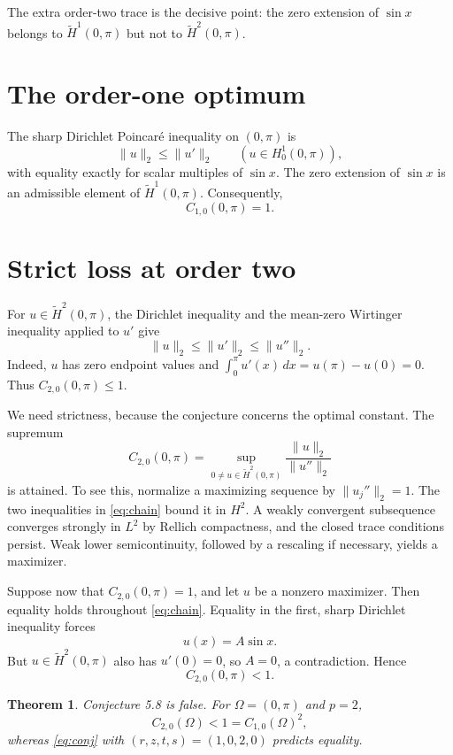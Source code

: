 \documentclass[11pt]{article}
\newtheorem{theorem}{Theorem}
\begin{document}
The extra order-two trace is the decisive point: the zero extension of
$\sin x$ belongs to $\widetilde H^1(0,\pi)$ but not to
$\widetilde H^2(0,\pi)$.

\section{The order-one optimum}

The sharp Dirichlet Poincar\'e inequality on $(0,\pi)$ is
\[
 \|u\|_2\le\|u'\|_2\qquad(u\in H_0^1(0,\pi)),
\]
with equality exactly for scalar multiples of $\sin x$.  The zero extension of
$\sin x$ is an admissible element of $\widetilde H^1(0,\pi)$.  Consequently,
\begin{equation}\label{eq:c10}
 C_{1,0}(0,\pi)=1.
\end{equation}

\section{Strict loss at order two}

For $u\in\widetilde H^2(0,\pi)$, the Dirichlet inequality and the mean-zero
Wirtinger inequality applied to $u'$ give
\begin{equation}\label{eq:chain}
 \|u\|_2\le\|u'\|_2\le\|u''\|_2.
\end{equation}
Indeed, $u$ has zero endpoint values and
$\int_0^\pi u'(x)\,dx=u(\pi)-u(0)=0$.  Thus
$C_{2,0}(0,\pi)\le1$.

We need strictness, because the conjecture concerns the optimal constant.  The
supremum
\[
 C_{2,0}(0,\pi)=
 \sup_{0\ne u\in\widetilde H^2(0,\pi)}
 \frac{\|u\|_2}{\|u''\|_2}
\]
is attained.  To see this, normalize a maximizing sequence by
$\|u_j''\|_2=1$.  The two inequalities in \eqref{eq:chain} bound it in $H^2$.
A weakly convergent subsequence converges strongly in $L^2$ by Rellich
compactness, and the closed trace conditions persist.  Weak lower
semicontinuity, followed by a rescaling if necessary, yields a maximizer.

Suppose now that $C_{2,0}(0,\pi)=1$, and let $u$ be a nonzero maximizer.
Then equality holds throughout \eqref{eq:chain}.  Equality in the first,
sharp Dirichlet inequality forces
\[
 u(x)=A\sin x.
\]
But $u\in\widetilde H^2(0,\pi)$ also has $u'(0)=0$, so $A=0$, a
contradiction.  Hence
\begin{equation}\label{eq:c20}
 C_{2,0}(0,\pi)<1.
\end{equation}

\begin{theorem}
Conjecture 5.8 is false.  For $\Omega=(0,\pi)$ and $p=2$,
\[
 C_{2,0}(\Omega)<1=C_{1,0}(\Omega)^2,
\]
whereas \eqref{eq:conj} with $(r,z,t,s)=(1,0,2,0)$ predicts equality.
\end{theorem}
\end{document}
